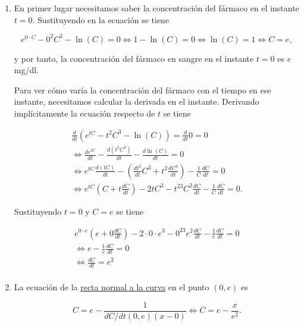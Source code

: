 \documentclass[
  spanish,
  a4paper,
]{scrreport}
\theoremstyle{definition}
\theoremstyle{remark}
\begin{document}
\begin{tcolorbox}[enhanced jigsaw, arc=.35mm, bottomrule=.15mm, bottomtitle=1mm, breakable, colback=white, colbacktitle=quarto-callout-tip-color!10!white, colframe=quarto-callout-tip-color-frame, coltitle=black, left=2mm, leftrule=.75mm, opacityback=0, opacitybacktitle=0.6, rightrule=.15mm, title=\textcolor{quarto-callout-tip-color}{\faLightbulb}\hspace{0.5em}{Solución}, titlerule=0mm, toprule=.15mm, toptitle=1mm]

\begin{enumerate}
\def\labelenumi{\alph{enumi}.}
\item
  En primer lugar necesitamos saber la concentración del fármaco en el
  instante \(t=0\). Sustituyendo en la ecuación se tiene

  \[
  e^{0\cdot C}-0^2C^3-\ln(C)=0 \Leftrightarrow 1-\ln(C)=0 \Leftrightarrow \ln(C)=1 \Leftrightarrow C = e,
  \]

  y por tanto, la concentración del fármaco en sangre en el instante
  \(t=0\) es \(e\) mg/dl.

  Para ver cómo varía la concentración del fármaco con el tiempo en ese
  instante, necesitamos calcular la derivada en el instante. Derivando
  implícitamente la ecuación respecto de \(t\) se tiene

  \[
  \begin{gathered}
  \frac{d}{dt}\left(e^{tC}-t^2C^3-\ln(C)\right) = \frac{d}{dt}0 = 0 \\
  \Leftrightarrow \frac{de^{tC}}{dt}-\frac{d(t^2C^3)}{dt}-\frac{d\ln(C)}{dt} = 0 \\
  \Leftrightarrow e^{tC}\frac{d(tC)}{dt}-\left(\frac{dt^2}{dt}C^3+t^2\frac{dC^3}{dt}\right)-\frac{1}{C}\frac{dC}{dt} = 0 \\
  \Leftrightarrow e^{tC}\left(C+t\frac{dC}{dt}\right)-2tC^3-t^23C^2\frac{dC}{dt}-\frac{1}{C}\frac{dC}{dt} = 0.
  \end{gathered}
  \]

  Sustituyendo \(t=0\) y \(C=e\) se tiene

  \[
  \begin{gathered}
  e^{0\cdot e}\left(e+0\frac{dC}{dt}\right)-2\cdot 0\cdot e^3-0^23e^2\frac{dC}{dt}-\frac{1}{e}\frac{dC}{dt} = 0 \\
  \Leftrightarrow e -\frac{1}{e}\frac{dC}{dt} = 0 \\
  \Leftrightarrow \frac{dC}{dt} = e^2 \\
  \end{gathered}
  \]
\item
  La ecuación de la
  \href{https://aprendeconalf.es/analisis-manual/07-derivadas.html\#def-normal-funcion}{recta
  normal a la curva} en el punto \((0,e)\) es

  \[
  C = e -\frac{1}{dC/dt (0,e)(x-0)} 
  \Leftrightarrow C = e -\frac{x}{e^2}.
  \]
\end{enumerate}

\end{tcolorbox}
\end{document}
